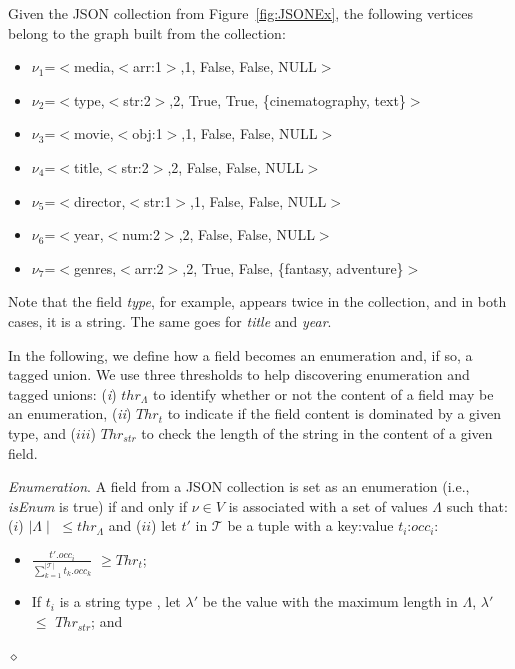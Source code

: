 \begin{example}
    Given the JSON collection from Figure~\ref{fig:JSONEx}, the following vertices belong to the graph built from the collection: \\
     \begin{itemize}
         \item \(\nu_1\)=$<$media,$<$arr:1$>$,1, False, False, NULL$>$
         \item \(\nu_2\)=$<$type,$<$str:2$>$,2, True, True, \{cinematography, text\}$>$
         \item \(\nu_3\)=$<$movie,$<$obj:1$>$,1, False, False, NULL$>$
         \item \(\nu_4\)=$<$title,$<$str:2$>$,2, False, False, NULL$>$
         \item \(\nu_5\)=$<$director,$<$str:1$>$,1, False, False, NULL$>$
         \item \(\nu_6\)=$<$year,$<$num:2$>$,2, False, False, NULL$>$
         \item \(\nu_7\)=$<$genres,$<$arr:2$>$,2, True, False, \{fantasy, adventure\}$>$        
     \end{itemize}
\end{example}
Note that the field \textit{type}, for example, appears twice in the collection, and in both cases, it is a string. The same goes for \textit{title} and \textit{year}. 

In the following, we define how a field becomes an enumeration and, if so, a tagged union. 
We use three thresholds to help discovering enumeration and tagged unions: (\textit{i}) \(thr_\Lambda\) to identify whether or not the content of a field may be an enumeration, (\textit{ii})  $Thr_t$ to indicate if the field content is dominated by a given type, and ($iii$) $Thr_{str}$  to check the length of the string in the content of a given field.

\begin{definition} {\it Enumeration}.
 A field from a JSON collection is set as an enumeration (i.e., \textit{isEnum} is true) if and only if  \(\nu \in V\) is associated with a set of values \(\Lambda\) such that: ($i$)  \(\mid\Lambda\mid\) \(\le thr_\Lambda\) and
 ($ii$) let $t'$   in $\mathcal{T}$ be a tuple with a key:value $t_i$:$occ_i$:
 \begin{itemize}
     \item \(\frac{t'.occ_i}{\sum_{k=1}^{|\mathcal{T}|} t_k.occ_k}\) $\geq Thr_t$;
     \item If $t_i$ is a string type , let $\lambda'$ be the value with the maximum length in $\Lambda$,  $\lambda'$ $\leq$ $Thr_{str}$; and
 \end{itemize}
   \hfill{$\diamond$}
   \label{def:Enum}
\end{definition}

